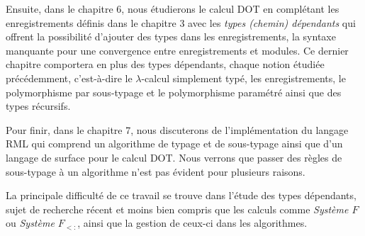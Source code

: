 Ensuite, dans le chapitre 6, nous étudierons le calcul DOT en complétant les
enregistrements définis dans le chapitre 3 avec les \textit{types (chemin)
dépendants} qui offrent la possibilité d'ajouter des types dans les
enregistrements, la syntaxe manquante pour une
convergence entre enregistrements et modules. Ce dernier chapitre comportera en
plus des types dépendants, chaque notion étudiée précédemment,
c'est-à-dire le $\lambda$-calcul simplement typé, les
enregistrements, le polymorphisme par sous-typage et le polymorphisme paramétré
ainsi que des types récursifs.

Pour finir, dans le chapitre 7, nous discuterons de l'implémentation du langage
RML\cite{rml-github} qui comprend un algorithme de typage et de sous-typage
ainsi que d'un langage de surface pour le
calcul DOT. Nous verrons que passer des règles de sous-typage à un algorithme
n'est pas évident pour plusieurs raisons.


La principale difficulté de ce travail se trouve dans l'étude des types
dépendants, sujet de recherche récent et moins bien compris que les
calculs comme \textit{Système $F$} ou \textit{Système $F_{<:}$}, ainsi que
la gestion de ceux-ci dans les algorithmes.
